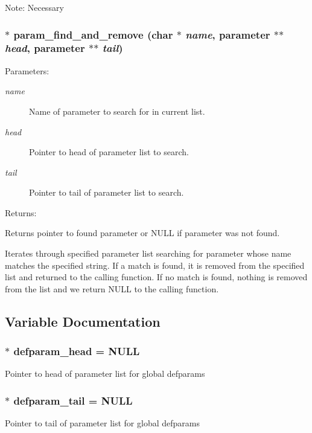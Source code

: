 Note: Necessary 
\subsubsection{$\ast$ param\_\-find\_\-and\_\-remove (char $\ast$ {\em name}, {\bf parameter} $\ast$$\ast$ {\em head}, {\bf parameter} $\ast$$\ast$ {\em tail})}\label{param_8c_a3}


\begin{Desc}
\item[Parameters: ]\par
\begin{description}
\item[{\em 
name}]Name of parameter to search for in current list. \item[{\em 
head}]Pointer to head of parameter list to search. \item[{\em 
tail}]Pointer to tail of parameter list to search.\end{description}
\end{Desc}
\begin{Desc}
\item[Returns: ]\par
Returns pointer to found parameter or NULL if parameter was not found.\end{Desc}
Iterates through specified parameter list searching for parameter whose name matches the specified string. If a match is found, it is removed from the specified list and returned to the calling function. If no match is found, nothing is removed from the  list and we return NULL to the calling function. 

\subsection{Variable Documentation}
\subsubsection{$\ast$ defparam\_\-head = NULL}\label{param_8c_a0}


Pointer to head of parameter list for global defparams 
\subsubsection{$\ast$ defparam\_\-tail = NULL}\label{param_8c_a1}


Pointer to tail of parameter list for global defparams 